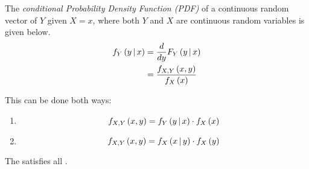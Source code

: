 \begin{definition}\label{def:Continuous Random Vector-Conditional PDF}
  The \emph{conditional Probability Density Function (PDF)} of a continuous random vector of $Y$ given $X=x$, where both $Y$ and $X$ are continuous random variables is given below.
  \begin{equation}
    \begin{aligned}
      f_{Y} \left( y \operatorname{\vert} x \right) &= \frac{d}{dy} F_{Y} \left( y \operatorname{\vert} x \right) \\
      &= \frac{f_{X,Y} \left( x,y \right)}{f_{X} \left( x \right)} \\
    \end{aligned}
  \end{equation}
  \begin{remark}
    This can be done both ways:
    \begin{enumerate}
    \item \begin{equation*}
        f_{X,Y} \left( x,y \right) = f_{Y} \left( y \operatorname{\vert} x \right) \cdot f_{X} \left( x \right)
      \end{equation*}
    \item \begin{equation*}
        f_{X,Y} \left( x,y \right) = f_{X} \left( x \operatorname{\vert} y \right) \cdot f_{X} \left( y \right)
      \end{equation*}
    \end{enumerate}
  \end{remark}
  \begin{remark}
    The  satisfies all .
  \end{remark}
\end{definition}
